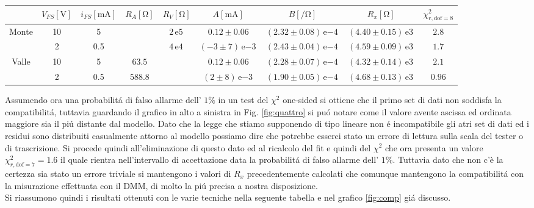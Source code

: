 \documentclass{article}
\newcommand{\E}[1]{\, \mathrm{e}{#1} \, }
\begin{document}
\hspace{-2cm}
\vspace{12pt}
\begin{tabular}{c|c|c|c|c|c|c|c|c}
	& $V_{FS} [\si{\volt}]$ & $i_{FS} [\si{\milli\ampere}]$ & $R_A [\si{\ohm}]$ & $R_V [\si{\ohm}]$ & $A [\si{\milli\ampere}]$ & $B [\si{\per\ohm}]$ & $R_x [\si{\ohm}]$ & $\chi ^2_{r,\mathrm{dof}=8}$ \\
	\hline
	Monte 
	& 10 & 5 &  & $2 \E{5}$ & $0.12 \pm 0.06$ & $(2.32 \pm 0.08)\E{-4}$ & $(4.40 \pm 0.15)\E{3}$ & $2.8$ \\
	& 2 & 0.5 &  & $4 \E{4}$ & $(-3 \pm 7)\E{-3}$ & $(2.43 \pm 0.04)\E{-4}$ & $(4.59\pm0.09)\E{3}$ & $1.7$ \\
	Valle 
	& 10 & 5 & $63.5$ &  & $0.12 \pm 0.06$ & $(2.28 \pm 0.07)\E{-4}$ & $(4.32 \pm 0.14)\E{3}$ & $2.1$ \\
	& 2 & 0.5 & $588.8$ &  & $(2 \pm 8)\E{-3}$ & $(1.90 \pm 0.05)\E{-4}$ & $(4.68\pm0.13)\E{3}$ & $0.96$
\end{tabular}

Assumendo ora una probabilit\'a di falso allarme dell' $1 \%$ in un test del $\chi^2$ one-sided si ottiene che il primo set di dati non soddisfa la compatibilit\'a, tuttavia guardando il grafico in alto a sinistra in Fig. \ref{fig:quattro} si pu\'o notare come il valore avente ascissa ed ordinata maggiore sia il pi\'u distante dal modello. Dato che la legge che stiamo supponendo di tipo lineare non \'e incompatibile gli atri set di dati ed i residui sono distribuiti casualmente attorno al modello possiamo dire che potrebbe esserci stato un errore di lettura sulla scala del tester o di trascrizione. Si procede quindi all'eliminazione di questo dato ed al ricalcolo del fit e quindi del $\chi^2$ che ora presenta un valore $\chi^2_{r,\mathrm{dof}=7}=1.6$ il quale rientra nell'intervallo di accettazione data la probabilit\'a di falso allarme dell' $1\%$. Tuttavia dato che non c'è la certezza sia stato un errore triviale si mantengono i valori di $R_x$ precedentemente calcolati che comunque mantengono la compatibilit\'a con la misurazione effettuata con il DMM, di molto la pi\'u precisa a nostra disposizione.\\

Si riassumono quindi i risultati ottenuti con le varie tecniche nella seguente tabella e nel grafico \ref{fig:comp} gi\'a discusso.\\
\end{document}
